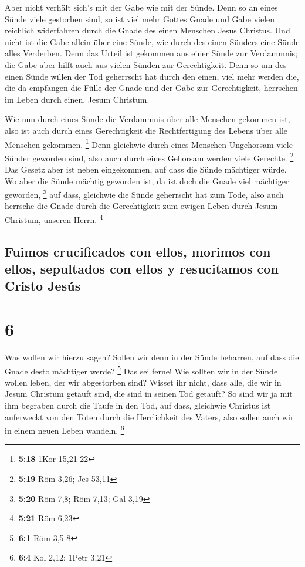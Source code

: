  Aber nicht verhält sich's mit der Gabe wie mit der
Sünde. Denn so an eines Sünde viele gestorben sind, so ist viel mehr
Gottes Gnade und Gabe vielen reichlich widerfahren durch die Gnade des
einen Menschen Jesus Christus.  Und nicht ist die Gabe
allein über eine Sünde, wie durch des einen Sünders eine Sünde alles
Verderben. Denn das Urteil ist gekommen aus einer Sünde zur Verdammnis;
die Gabe aber hilft auch aus vielen Sünden zur Gerechtigkeit.
 Denn so um des einen Sünde willen der Tod geherrscht hat
durch den einen, viel mehr werden die, die da empfangen die Fülle der
Gnade und der Gabe zur Gerechtigkeit, herrschen im Leben durch einen,
Jesum Christum.

 Wie nun durch eines Sünde die Verdammnis über alle
Menschen gekommen ist, also ist auch durch eines Gerechtigkeit die
Rechtfertigung des Lebens über alle Menschen gekommen. \footnote{\textbf{5:18}
  1Kor 15,21-22}  Denn gleichwie durch eines Menschen
Ungehorsam viele Sünder geworden sind, also auch durch eines Gehorsam
werden viele Gerechte. \footnote{\textbf{5:19} Röm 3,26; Jes 53,11}
 Das Gesetz aber ist neben eingekommen, auf dass die
Sünde mächtiger würde. Wo aber die Sünde mächtig geworden ist, da ist
doch die Gnade viel mächtiger geworden, \footnote{\textbf{5:20} Röm 7,8;
  Röm 7,13; Gal 3,19}  auf dass, gleichwie die Sünde
geherrscht hat zum Tode, also auch herrsche die Gnade durch die
Gerechtigkeit zum ewigen Leben durch Jesum Christum, unseren Herrn.
\footnote{\textbf{5:21} Röm 6,23}

\hypertarget{fuimos-crucificados-con-ellos-morimos-con-ellos-sepultados-con-ellos-y-resucitamos-con-cristo-jesuxfas}{%
\subsection{Fuimos crucificados con ellos, morimos con ellos, sepultados
con ellos y resucitamos con Cristo
Jesús}\label{fuimos-crucificados-con-ellos-morimos-con-ellos-sepultados-con-ellos-y-resucitamos-con-cristo-jesuxfas}}

\hypertarget{section-5}{%
\section{6}\label{section-5}}

 Was wollen wir hierzu sagen? Sollen wir denn in der Sünde
beharren, auf dass die Gnade desto mächtiger werde? \footnote{\textbf{6:1}
  Röm 3,5-8}  Das sei ferne! Wie sollten wir in der Sünde
wollen leben, der wir abgestorben sind?  Wisset ihr nicht,
dass alle, die wir in Jesum Christum getauft sind, die sind in seinen
Tod getauft?  So sind wir ja mit ihm begraben durch die
Taufe in den Tod, auf dass, gleichwie Christus ist auferweckt von den
Toten durch die Herrlichkeit des Vaters, also sollen auch wir in einem
neuen Leben wandeln. \footnote{\textbf{6:4} Kol 2,12; 1Petr 3,21}

